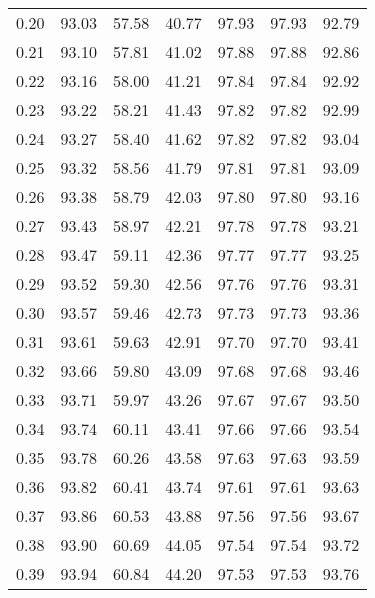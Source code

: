 \begin{tabular}{|c|c|c|c|c|c|c|}
      0.20 &     93.03 &     57.58 &      40.77 &   97.93 &      97.93 &         92.79 \\
      0.21 &     93.10 &     57.81 &      41.02 &   97.88 &      97.88 &         92.86 \\
      0.22 &     93.16 &     58.00 &      41.21 &   97.84 &      97.84 &         92.92 \\
      0.23 &     93.22 &     58.21 &      41.43 &   97.82 &      97.82 &         92.99 \\
      0.24 &     93.27 &     58.40 &      41.62 &   97.82 &      97.82 &         93.04 \\
      0.25 &     93.32 &     58.56 &      41.79 &   97.81 &      97.81 &         93.09 \\
      0.26 &     93.38 &     58.79 &      42.03 &   97.80 &      97.80 &         93.16 \\
      0.27 &     93.43 &     58.97 &      42.21 &   97.78 &      97.78 &         93.21 \\
      0.28 &     93.47 &     59.11 &      42.36 &   97.77 &      97.77 &         93.25 \\
      0.29 &     93.52 &     59.30 &      42.56 &   97.76 &      97.76 &         93.31 \\
      0.30 &     93.57 &     59.46 &      42.73 &   97.73 &      97.73 &         93.36 \\
      0.31 &     93.61 &     59.63 &      42.91 &   97.70 &      97.70 &         93.41 \\
      0.32 &     93.66 &     59.80 &      43.09 &   97.68 &      97.68 &         93.46 \\
      0.33 &     93.71 &     59.97 &      43.26 &   97.67 &      97.67 &         93.50 \\
      0.34 &     93.74 &     60.11 &      43.41 &   97.66 &      97.66 &         93.54 \\
      0.35 &     93.78 &     60.26 &      43.58 &   97.63 &      97.63 &         93.59 \\
      0.36 &     93.82 &     60.41 &      43.74 &   97.61 &      97.61 &         93.63 \\
      0.37 &     93.86 &     60.53 &      43.88 &   97.56 &      97.56 &         93.67 \\
      0.38 &     93.90 &     60.69 &      44.05 &   97.54 &      97.54 &         93.72 \\
      0.39 &     93.94 &     60.84 &      44.20 &   97.53 &      97.53 &         93.76 \\

\end{tabular}
